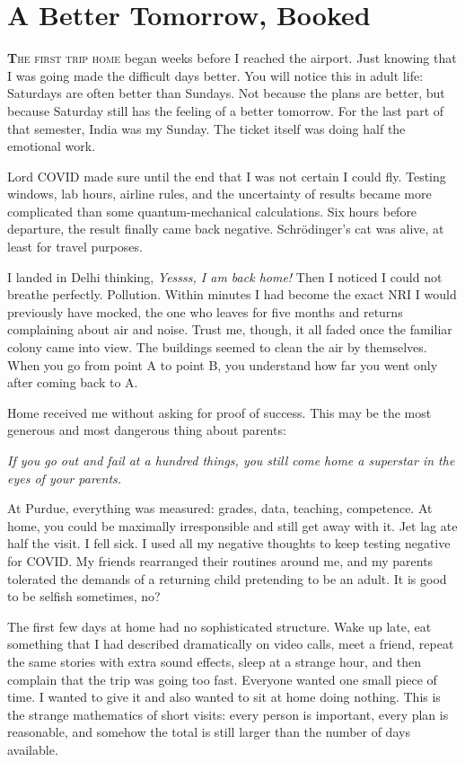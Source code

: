 \documentclass[11pt,twoside,openany]{book}
\newcommand{\dropcap}[2]{\lettrine[lines=3,findent=2pt,nindent=4pt]{\color{accent}\textsf{\textbf{#1}}}{#2}}
\begin{document}
\chapter{A Better Tomorrow, Booked}

\dropcap{T}{he first trip home} began weeks before I reached the airport. Just
knowing that I was going made the difficult days better. You will notice this
in adult life: Saturdays are often better than Sundays. Not because the plans
are better, but because Saturday still has the feeling of a better tomorrow.
For the last part of that semester, India was my Sunday. The ticket itself was
doing half the emotional work.

Lord COVID made sure until the end that I was not certain I could fly. Testing
windows, lab hours, airline rules, and the uncertainty of results became more
complicated than some quantum-mechanical calculations. Six hours before
departure, the result finally came back negative. Schr\"odinger's cat was
alive, at least for travel purposes.

I landed in Delhi thinking, \textit{Yessss, I am back home!} Then I noticed I
could not breathe perfectly. Pollution. Within minutes I had become the exact
NRI I would previously have mocked, the one who leaves for five months and
returns complaining about air and noise. Trust me, though, it all faded once
the familiar colony came into view. The buildings seemed to clean the air by
themselves. When you go from point A to point B, you understand how far you
went only after coming back to A.

Home received me without asking for proof of success. This may be the most
generous and most dangerous thing about parents:

\begin{pquote}\itshape
If you go out and fail at a hundred things, you still come home a superstar in
the eyes of your parents.
\end{pquote}

At Purdue, everything was measured: grades, data, teaching, competence. At
home, you could be maximally irresponsible and still get away with it. Jet lag
ate half the visit. I fell sick. I used all my negative thoughts to keep
testing negative for COVID. My friends rearranged their routines around me,
and my parents tolerated the demands of a returning child pretending to be an
adult. It is good to be selfish sometimes, no?

The first few days at home had no sophisticated structure. Wake up late, eat
something that I had described dramatically on video calls, meet a friend,
repeat the same stories with extra sound effects, sleep at a strange hour,
and then complain that the trip was going too fast. Everyone wanted one small
piece of time. I wanted to give it and also wanted to sit at home doing
nothing. This is the strange mathematics of short visits: every person is
important, every plan is reasonable, and somehow the total is still larger
than the number of days available.
\end{document}
